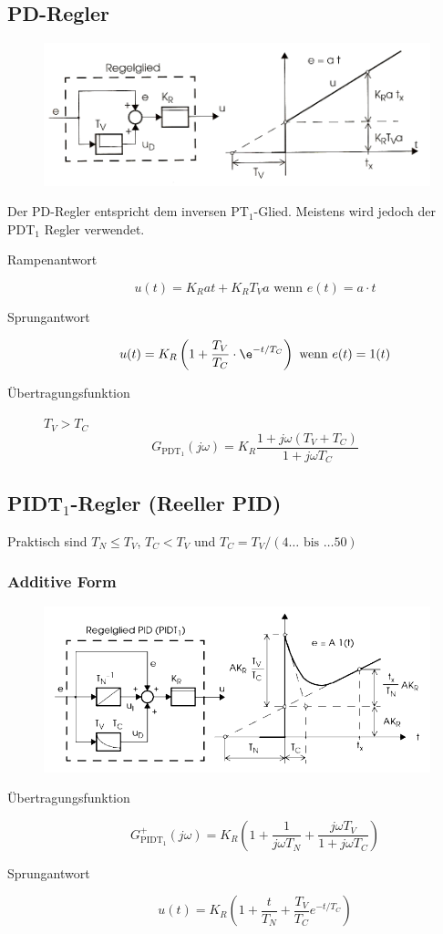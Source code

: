 \subsection{PD-Regler}
\begin{figure}[h!]
	\includegraphics[width=\linewidth]{./images/PD_Regler.png}
\end{figure}
Der PD-Regler entspricht dem inversen PT\(_1\)-Glied. Meistens wird jedoch der PDT\(_1\) Regler verwendet.
\begin{description}
	\item[Rampenantwort]
		\[
			u(t) = K_R at + K_R T_V a \text{ wenn } e(t) = a\cdot t
		\]
	\item[Sprungantwort]
		\[
			u(t) = K_R \left( 1 + \frac{T_V}{T_C} \cdot \e^{-t/T_C} \right)
			\text{ wenn } e(t) = 1(t)
		\]
	\item[\"Ubertragungsfunktion] \(T_V > T_C\)
		\[
			G_{\text{PDT}_1}(j\omega) = K_R \frac{1+j\omega(T_V+T_C)}{1+j\omega T_C}
		\]
\end{description}
 

\subsection{PIDT\(_1\)-Regler (Reeller PID) }
Praktisch sind \(T_N \leq T_V\), \(T_C < T_V\) und \(T_C = T_V/(4\ldots \text{ bis }\ldots 50)\)

\subsubsection{Additive Form}
\begin{figure}[h!]
	\includegraphics[width = \linewidth]{./images/PID_Regler_add}
\end{figure}
\begin{description}
	\item[\"Ubertragungsfunktion]
		\[
			G_{\text{PIDT}_1}^{+} (j\omega) = K_R \left(
				1 + \frac{1}{j\omega T_N} + \frac{j\omega T_V}{1 + j\omega T_C}
			\right)
		\]
	\item[Sprungantwort]
		\[
			u(t) = K_R \left( 1 + \frac{t}{T_N} + \frac{T_V}{T_C}e^{-t/T_C} \right)
		\]
\end{description}

